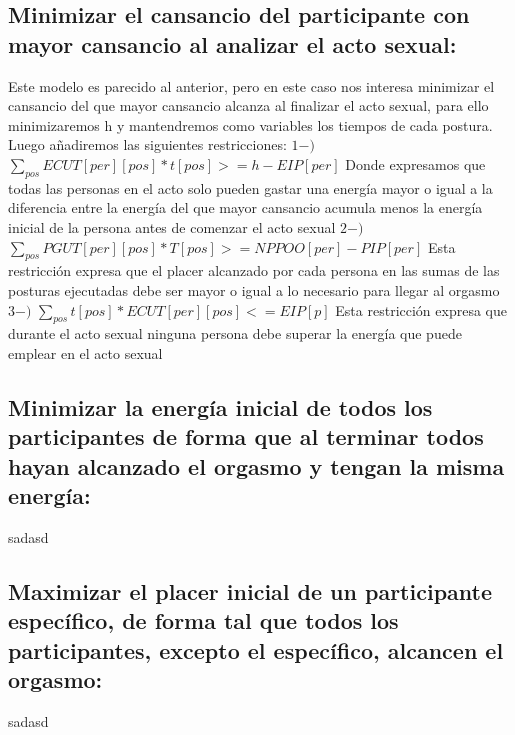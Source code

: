 \documentclass{llncs}
\begin{document}
\subsection{Minimizar el cansancio del participante con mayor cansancio al analizar el acto sexual:}
Este modelo es parecido al anterior, pero en este caso nos interesa minimizar el cansancio del que mayor cansancio alcanza al finalizar el acto sexual, para ello minimizaremos h y mantendremos como variables los tiempos de cada postura.
\newline
\newline
Luego añadiremos las siguientes restricciones:
\newline
\newline
$1-)$ $\sum_{pos} ECUT[per][pos]*t[pos] >= h - EIP[per]$
\newline
\newline
Donde expresamos que todas las personas en el acto solo pueden gastar una energía mayor o igual a la diferencia entre la energía del que mayor cansancio acumula menos la energía inicial de la persona antes de comenzar el acto sexual
\newline
\newline
$2-)$ $\sum_{pos} PGUT[per][pos]*T[pos] >= NPPOO[per] - PIP[per]$
\newline
\newline
Esta restricción expresa que el placer alcanzado por cada persona en las sumas de las posturas ejecutadas debe ser mayor o igual a lo necesario para llegar al orgasmo
\newline
\newline
$3-)$ $\sum_{pos} t[pos]*ECUT[per][pos] <= EIP[p]$
\newline
\newline
Esta restricción expresa que durante el acto sexual ninguna persona debe superar la energía que puede emplear en el acto sexual

\subsection{Minimizar la energía inicial de todos los participantes de forma que al terminar todos hayan alcanzado el orgasmo y tengan la misma energía:}
sadasd

\subsection{Maximizar el placer inicial de un participante específico, de forma tal que todos los participantes, excepto el específico, alcancen el orgasmo:}
sadasd
\end{document}
